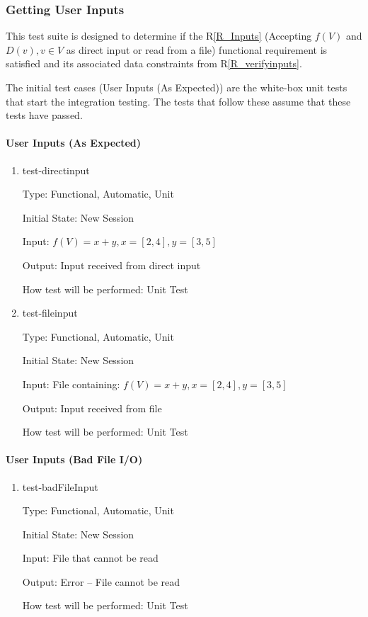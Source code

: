 \documentclass[12pt, titlepage]{article}
\newcommand{\rref}[1]{R\ref{#1}}
\begin{document}
\subsubsection{Getting User Inputs}
\label{tests_gettingInputs}
This test suite is designed to determine if the \rref{R_Inputs} (Accepting 
$f(V)$ and $D(v), v \in V$ as direct input or read from a file) functional 
requirement is satisfied and its associated data constraints from 
\rref{R_verifyinputs}.

The initial test cases (User Inputs (As Expected)) are the white-box unit tests 
that start the integration testing. The tests that follow these assume that 
these tests have passed.

\paragraph{User Inputs (As Expected)}

\begin{enumerate}
	
	\item{test-directinput}
	
	Type: Functional, Automatic, Unit
	
	Initial State: New Session
	
	Input: $f(V) = x + y, x = [2,4], y = [3,5]$
	
	Output: Input received from direct input
	
	How test will be performed: Unit Test\\
	
	\item{test-fileinput}

	Type: Functional, Automatic, Unit
	
	Initial State: New Session
	
	Input: File containing: $f(V) = x + y, x = [2,4], y = [3,5]$
	
	Output: Input received from file
	
	How test will be performed: Unit Test\\
\end{enumerate}
	
\paragraph{User Inputs (Bad File I/O)}

\begin{enumerate}
	
	\item{test-badFileInput}
	
	Type: Functional, Automatic, Unit
	
	Initial State: New Session
	
	Input: File that cannot be read
	
	Output: Error -- File cannot be read
	
	How test will be performed: Unit Test\\
\end{enumerate}
	
\end{document}
